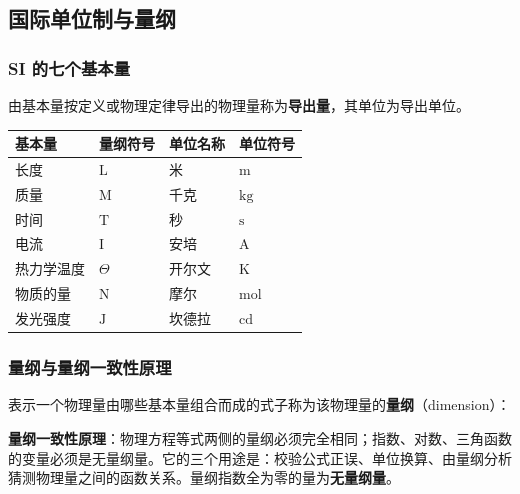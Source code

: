     \subsection{国际单位制与量纲}
        \subsubsection{SI 的七个基本量}
        由基本量按定义或物理定律导出的物理量称为\textbf{导出量}，其单位为导出单位。
        \begin{center}
        \begin{tabular}{llll}
        \toprule
        基本量 & 量纲符号 & 单位名称 & 单位符号 \\
        \midrule
        长度 & $\mathrm{L}$ & 米 & $\mathrm{m}$ \\
        质量 & $\mathrm{M}$ & 千克 & $\mathrm{kg}$ \\
        时间 & $\mathrm{T}$ & 秒 & $\mathrm{s}$ \\
        电流 & $\mathrm{I}$ & 安培 & $\mathrm{A}$ \\
        热力学温度 & $\varTheta$ & 开尔文 & $\mathrm{K}$ \\
        物质的量 & $\mathrm{N}$ & 摩尔 & $\mathrm{mol}$ \\
        发光强度 & $\mathrm{J}$ & 坎德拉 & $\mathrm{cd}$ \\
        \bottomrule
        \end{tabular}
        \end{center}

        \subsubsection{量纲与量纲一致性原理}
        表示一个物理量由哪些基本量组合而成的式子称为该物理量的\textbf{量纲}（dimension）：

        \textbf{量纲一致性原理}：物理方程等式两侧的量纲必须完全相同；指数、对数、三角函数的变量必须是无量纲量。它的三个用途是：校验公式正误、单位换算、由量纲分析猜测物理量之间的函数关系。量纲指数全为零的量为\textbf{无量纲量}。

